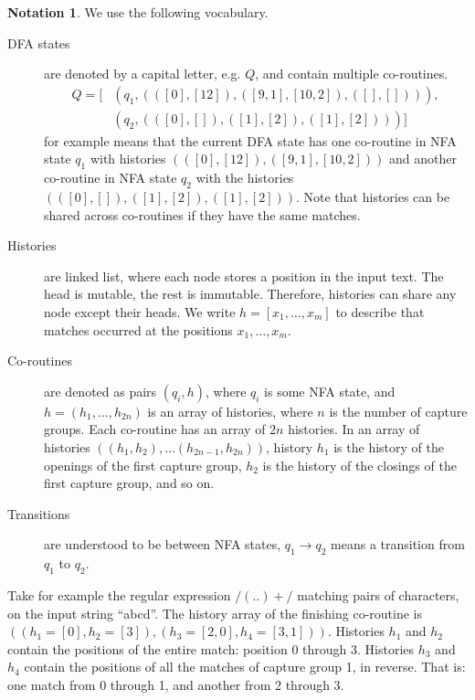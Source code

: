\documentclass[11pt,a4paper,twoside,openright]{Thesis}
\theoremstyle{definition}
\newtheorem*{notation}{Notation}
\newcommand{\regex}[1]{\ensuremath{\mathtt{/#1/}}}
\newcommand{\str}[1]{``#1''}
\begin{document}
\begin{notation}
We use the following vocabulary.

\begin{description}
\item[DFA states] are denoted by a capital letter, e.g. $Q$, and
	contain multiple co-routines.
  \begin{equation*}\begin{split}Q=[&(q_1, (([0], [12]), ([9, 1], [10, 2]), ([], []))),\\
    &(q_2, (([0], []), ([1], [2]), ([1], [2])))]\end{split}\end{equation*} for example means
	that the current DFA state has one co-routine in NFA state $q_1$ with
	histories $(([0], [12]), ([9, 1], [10, 2]))$ and another co-routine in NFA state
	$q_2$ with the histories $(([0], []), ([1], [2]), ([1], [2]))$.
	Note that histories can be shared across co-routines if they
	have the same matches.
\item[Histories] are linked list, where each node stores a position in the
  input text.  The head is mutable, the rest is immutable. Therefore, histories
  can share any node except their heads. We write $h=[x_1, \dots, x_m]$ to
  describe that matches occurred at the positions $x_1, \dots, x_m$.
\item[Co-routines] are denoted as pairs $(q_i, h)$, where $q_i$ is some
	NFA state, and $h = (h_1, \dots, h_{2n})$ is an array of histories,
	where $n$ is the number of capture groups.  Each co-routine has an array
  of $2n$ histories. In an array of histories $((h_1, h_2), \dots
  (h_{2n-1}, h_{2n}))$, history $h_1$ is the history of the openings
	of the first capture group, $h_2$ is the history of the closings of
	the first capture group, and so on.
\item[Transitions] are  understood to be between NFA states,
	$q_1\rightarrow q_2$ means a transition from $q_1$ to $q_2$.
\end{description}

Take for example the regular expression \regex{(..)+} matching
pairs of characters, on the input string \str{abcd}. The history array of the
finishing co-routine  is $((h_1=[0], h_2=[3]), (h_3=[2,0], h_4=[3,1]))$.
Histories $h_1$ and $h_2$ contain the positions of the entire match: position 0
through 3.  Histories $h_3$ and $h_4$ contain the positions of all the matches of
capture group 1, in reverse. That is: one match from 0 through 1, and another from
2 through 3.


\end{notation}
\end{document}
